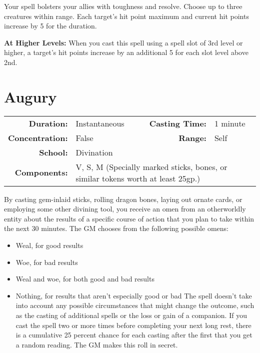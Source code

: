 \documentclass[a5paper, 12pt]{memoir}
\begin{document}
\vspace{1\baselineskip}\noindent Your spell bolsters your allies with toughness and resolve. Choose up to three creatures within range. Each target's hit point maximum and current hit points increase by 5 for the duration.

\vspace{8pt} \noindent\textbf{At Higher Levels:} When you cast this spell using a spell slot of 3rd level or higher, a target's hit points increase by an additional 5 for each slot level above 2nd.
\newpage
\section*{Augury}

{
\small\centering\vspace{-6pt}
\begin{tabular}{rlrl}
\toprule

\textbf{Duration:} & Instantaneous &
\textbf{Casting Time:} & 1 minute \\
\textbf{Concentration:} & False &
\textbf{Range:} & Self \\
\textbf{School:} & Divination \\
\textbf{Components:} & \multicolumn{3}{p{0.7\textwidth}}{V, S, M (Specially marked sticks, bones, or similar tokens worth at least 25gp.)}\\

\bottomrule
\end{tabular}
}

\vspace{1\baselineskip}\noindent By casting gem-inlaid sticks, rolling dragon bones, laying out ornate cards, or employing some other divining tool, you receive an omen from an otherworldly entity about the results of a specific course of action that you plan to take within the next 30 minutes. The GM chooses from the following possible omens:
\begin{itemize}
    \item Weal, for good results
    \item Woe, for bad results
    \item Weal and woe, for both good and bad results
    \item Nothing, for results that aren't especially good or bad The spell doesn't take into account any possible circumstances that might change the outcome, such as the casting of additional spells or the loss or gain of a companion. If you cast the spell two or more times before completing your next long rest, there is a cumulative 25 percent chance for each casting after the first that you get a random reading. The GM makes this roll in secret.
\end{itemize}
\end{document}
